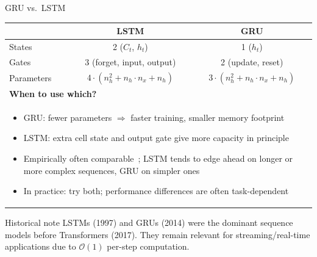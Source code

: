 \begin{frame}{GRU vs.\ LSTM}
  \begin{center}
  \renewcommand{\arraystretch}{1.3}
  \begin{tabular}{lcc}
    \toprule
    & \textbf{LSTM} & \textbf{GRU} \\
    \midrule
    States & 2 ($C_t$, $h_t$) & 1 ($h_t$) \\
    Gates & 3 (forget, input, output) & 2 (update, reset) \\
    Parameters & $4 \cdot (n_h^2 + n_h \cdot n_x + n_h)$ & $3 \cdot (n_h^2 + n_h \cdot n_x + n_h)$ \\
    \midrule
    \multicolumn{3}{l}{\textbf{When to use which?}} \\
    \midrule
    \multicolumn{3}{p{9cm}}{%
      \begin{itemize}
        \item GRU: fewer parameters $\Rightarrow$ faster training, smaller memory footprint
        \item LSTM: extra cell state and output gate give more capacity in principle
        \item Empirically often comparable~\cite{chung2014empirical}; LSTM tends to edge ahead on longer or more complex sequences, GRU on simpler ones~\cite{cahuantzi2021lstmgru}
        \item In practice: try both; performance differences are often task-dependent
      \end{itemize}
    } \\
    \bottomrule
  \end{tabular}
  \end{center}

  \vspace{0.3em}
  \begin{block}{Historical note}
    LSTMs (1997) and GRUs (2014) were the dominant sequence models before Transformers (2017). They remain relevant for streaming/real-time applications due to $\mathcal{O}(1)$ per-step computation.
  \end{block}
\end{frame}

